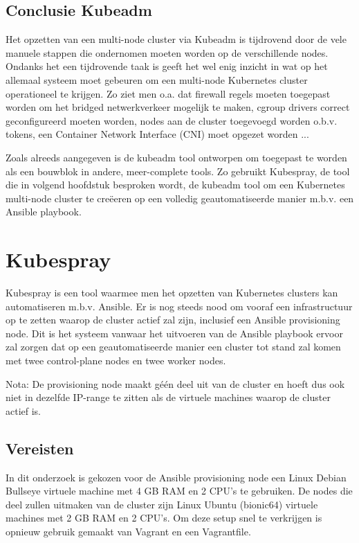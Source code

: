 \subsection{Conclusie Kubeadm}

Het opzetten van een multi-node cluster via Kubeadm is tijdrovend door de vele manuele stappen die ondernomen moeten worden op de verschillende nodes. Ondanks het een tijdrovende taak is geeft het wel enig inzicht in wat op het allemaal systeem moet gebeuren om een multi-node Kubernetes cluster operationeel te krijgen. Zo ziet men o.a. dat firewall regels moeten toegepast worden om het bridged netwerkverkeer mogelijk te maken, cgroup drivers correct geconfigureerd moeten worden, nodes aan de cluster toegevoegd worden o.b.v. tokens, een Container Network Interface (CNI) moet opgezet worden ... 

Zoals alreeds aangegeven is de kubeadm tool ontworpen om toegepast te worden als een bouwblok in andere, meer-complete tools. Zo gebruikt Kubespray, de tool die in volgend hoofdstuk besproken wordt, de kubeadm tool om een Kubernetes multi-node cluster te creëeren op een volledig geautomatiseerde manier m.b.v. een Ansible playbook.       

\section{Kubespray}

Kubespray is een tool waarmee men het opzetten van Kubernetes clusters kan automatiseren m.b.v. Ansible. Er is nog steeds nood om vooraf een infrastructuur op te zetten waarop de cluster actief zal zijn, inclusief een Ansible provisioning node. Dit is het systeem vanwaar het uitvoeren van de Ansible playbook ervoor zal zorgen dat op een geautomatiseerde manier een cluster tot stand zal komen met twee control-plane nodes en twee worker nodes. 

Nota: De provisioning node maakt géén deel uit van de cluster en hoeft dus ook niet in dezelfde IP-range te zitten als de virtuele machines waarop de cluster actief is.

\subsection{Vereisten}  

In dit onderzoek is gekozen voor de Ansible provisioning node een Linux Debian Bullseye virtuele machine met 4 GB RAM en 2 CPU's te gebruiken. De nodes die deel zullen uitmaken van de cluster zijn Linux Ubuntu (bionic64) virtuele machines met 2 GB RAM en 2 CPU's. Om deze setup snel te verkrijgen is opnieuw gebruik gemaakt van Vagrant en een Vagrantfile. 

